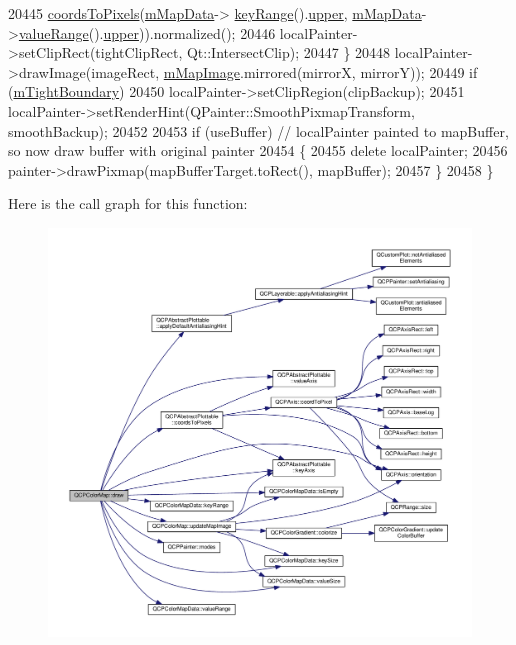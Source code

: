 \begin{DoxyCode}
20445                                   \hyperlink{class_q_c_p_abstract_plottable_ade710a776104b14c1c835168ce1bfc5c}{coordsToPixels}(\hyperlink{class_q_c_p_color_map_a8709272aa8f0be3ca111bf3866806f8b}{mMapData}->
      \hyperlink{class_q_c_p_color_map_data_a4765180639742460f64ab6c97c745c08}{keyRange}().\hyperlink{class_q_c_p_range_ae44eb3aafe1d0e2ed34b499b6d2e074f}{upper}, \hyperlink{class_q_c_p_color_map_a8709272aa8f0be3ca111bf3866806f8b}{mMapData}->\hyperlink{class_q_c_p_color_map_data_a025be4d7ba0494fd7b38a5a56c737f2a}{valueRange}().\hyperlink{class_q_c_p_range_ae44eb3aafe1d0e2ed34b499b6d2e074f}{upper})).normalized();
20446     localPainter->setClipRect(tightClipRect, Qt::IntersectClip);
20447   \}
20448   localPainter->drawImage(imageRect, \hyperlink{class_q_c_p_color_map_a66110813b42eca78b64095b2a1f285a0}{mMapImage}.mirrored(mirrorX, mirrorY));
20449   \textcolor{keywordflow}{if} (\hyperlink{class_q_c_p_color_map_ac2e9425fe4381b496726e1c09f978302}{mTightBoundary})
20450     localPainter->setClipRegion(clipBackup);
20451   localPainter->setRenderHint(QPainter::SmoothPixmapTransform, smoothBackup);
20452   
20453   \textcolor{keywordflow}{if} (useBuffer) \textcolor{comment}{// localPainter painted to mapBuffer, so now draw buffer with original painter}
20454   \{
20455     \textcolor{keyword}{delete} localPainter;
20456     painter->drawPixmap(mapBufferTarget.toRect(), mapBuffer);
20457   \}
20458 \}
\end{DoxyCode}


Here is the call graph for this function\+:\nopagebreak
\begin{figure}[H]
\begin{center}
\leavevmode
\includegraphics[width=350pt]{class_q_c_p_color_map_a3b0f45a3177be9522d5e9b8cd8ae122d_cgraph}
\end{center}
\end{figure}


